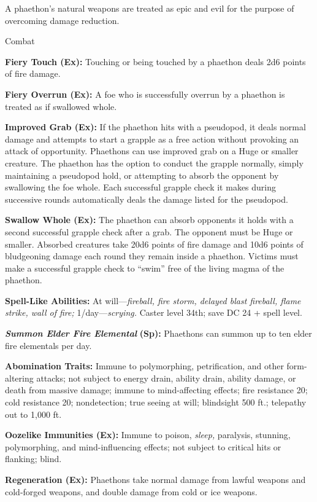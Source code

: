 \documentclass{article}
\begin{document}
A phaethon's natural weapons are treated as epic and evil for the purpose of overcoming 
damage reduction.

Combat\textbf{ }

\textbf{Fiery Touch (Ex):} Touching or being touched by a phaethon deals 2d6 points 
of fire damage. 

\textbf{Fiery Overrun (Ex):} A foe who is successfully overrun by a phaethon is 
treated as if swallowed whole. 

\textbf{Improved Grab (Ex):} If the phaethon hits with a pseudopod, it deals normal 
damage and attempts to start a grapple as a free action without provoking an attack 
of opportunity. Phaethons can use improved grab on a Huge or smaller creature. 
The phaethon has the option to conduct the grapple normally, simply maintaining 
a pseudopod hold, or attempting to absorb the opponent by swallowing the foe whole. 
Each successful grapple check it makes during successive rounds automatically deals 
the damage listed for the pseudopod. 

\textbf{Swallow Whole (Ex):} The phaethon can absorb opponents it holds with a 
second successful grapple check after a grab. The opponent must be Huge or smaller. 
Absorbed creatures take 20d6 points of fire damage and 10d6 points of bludgeoning 
damage each round they remain inside a phaethon. Victims must make a successful 
grapple check to ``swim'' free of the living magma of the phaethon. 

\textbf{Spell-Like Abilities:} At will---\textit{fireball, fire storm, delayed 
blast fireball, flame strike, wall of fire; }1/day---\textit{scrying. }Caster level 
34th; save DC 24 + spell level. 

\textit{\textbf{Summon Elder Fire Elemental }}\textbf{(Sp):} Phaethons can summon 
up to ten elder fire elementals per day. 

\textbf{Abomination Traits:} Immune to polymorphing, petrification, and other form-altering 
attacks; not subject to energy drain, ability drain, ability damage, or death from 
massive damage; immune to mind-affecting effects; fire resistance 20; cold resistance 
20; nondetection; true seeing at will; blindsight 500 ft.; telepathy out to 1,000 
ft. 

\textbf{Oozelike Immunities (Ex):} Immune to poison, \textit{sleep, }paralysis, 
stunning, polymorphing, and mind-influencing effects; not subject to critical hits 
or flanking; blind. 

\textbf{Regeneration (Ex):} Phaethons take normal damage from lawful weapons and 
cold-forged weapons, and double damage from cold or ice weapons. 
\end{document}
